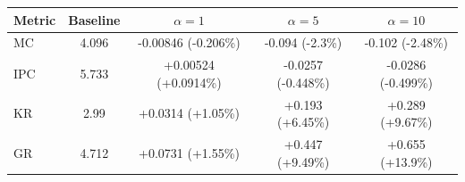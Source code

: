 \begin{tabular}{lcccc}
\toprule
Metric & Baseline & $\alpha=1$ & $\alpha=5$ & $\alpha=10$ \\
\midrule
MC & 4.096 & -0.00846 (-0.206\%) & -0.094 (-2.3\%) & -0.102 (-2.48\%) \\
IPC & 5.733 & +0.00524 (+0.0914\%) & -0.0257 (-0.448\%) & -0.0286 (-0.499\%) \\
KR & 2.99 & +0.0314 (+1.05\%) & +0.193 (+6.45\%) & +0.289 (+9.67\%) \\
GR & 4.712 & +0.0731 (+1.55\%) & +0.447 (+9.49\%) & +0.655 (+13.9\%) \\
\bottomrule
\end{tabular}
